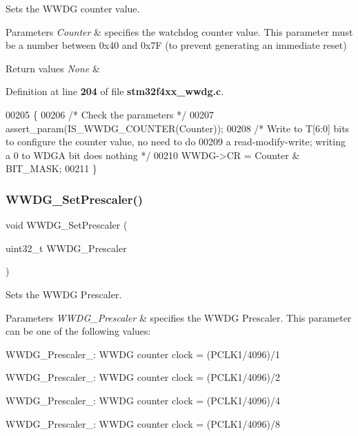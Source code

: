 Sets the W\+W\+DG counter value. 


\begin{DoxyParams}{Parameters}
{\em Counter} & specifies the watchdog counter value. This parameter must be a number between 0x40 and 0x7F (to prevent generating an immediate reset) \\
\hline
\end{DoxyParams}

\begin{DoxyRetVals}{Return values}
{\em None} & \\
\hline
\end{DoxyRetVals}


Definition at line \textbf{ 204} of file \textbf{ stm32f4xx\+\_\+wwdg.\+c}.


\begin{DoxyCode}
00205 \{
00206   \textcolor{comment}{/* Check the parameters */}
00207   assert_param(IS_WWDG_COUNTER(Counter));
00208   \textcolor{comment}{/* Write to T[6:0] bits to configure the counter value, no need to do}
00209 \textcolor{comment}{     a read-modify-write; writing a 0 to WDGA bit does nothing */}
00210   WWDG->CR = Counter & BIT_MASK;
00211 \}
\end{DoxyCode}
\mbox{\label{group__WWDG_gafeaa2b52c31ba7baca7eb61d2d42e07b}} 
\subsubsection{W\+W\+D\+G\+\_\+\+Set\+Prescaler()}
{\footnotesize\ttfamily void W\+W\+D\+G\+\_\+\+Set\+Prescaler (\begin{DoxyParamCaption}\item[{uint32\+\_\+t}]{W\+W\+D\+G\+\_\+\+Prescaler }\end{DoxyParamCaption})}



Sets the W\+W\+DG Prescaler. 


\begin{DoxyParams}{Parameters}
{\em W\+W\+D\+G\+\_\+\+Prescaler} & specifies the W\+W\+DG Prescaler. This parameter can be one of the following values\+: \begin{DoxyItemize}
\item W\+W\+D\+G\+\_\+\+Prescaler\+\_\+: W\+W\+DG counter clock = (P\+C\+L\+K1/4096)/1 \item W\+W\+D\+G\+\_\+\+Prescaler\+\_\+: W\+W\+DG counter clock = (P\+C\+L\+K1/4096)/2 \item W\+W\+D\+G\+\_\+\+Prescaler\+\_\+: W\+W\+DG counter clock = (P\+C\+L\+K1/4096)/4 \item W\+W\+D\+G\+\_\+\+Prescaler\+\_\+: W\+W\+DG counter clock = (P\+C\+L\+K1/4096)/8 \end{DoxyItemize}
\\
\hline
\end{DoxyParams}


